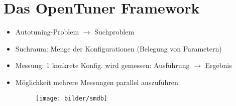     
  
    
  \section{Das OpenTuner Framework}   
    
  \begin{frame}
  \textbf{}
    
  \begin{itemize}
    \item Autotuning-Problem $\rightarrow$ Suchproblem
    \item Suchraum: Menge der Konfigurationen (Belegung von Parametern)
    \item Messung: 1 konkrete Konfig. wird gemessen: Ausführung $\rightarrow$ Ergebnis
    \item Möglichkeit mehrere Messungen parallel auszuführen
    
    \begin{figure}[ht]
      \centering	      
      \texttt{[image: bilder/smdb]}
      \label{smdb}
    \end{figure}

  \end{itemize}
  \end{frame}
    

